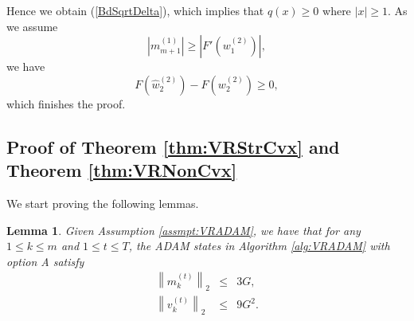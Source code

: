 \documentclass[twoside]{article}
\newtheorem{lemma}{Lemma}
\begin{document}
Hence we obtain (\ref{BdSqrtDelta}), which implies that $q(x)\geq 0$ where $|x|\geq1$. As we assume
\begin{equation*}
   \left|m^{(1)}_{m+1}\right| \geq \left|F'\left(w^{(2)}_{1}\right)\right|,
\end{equation*}
we have
\begin{equation*}
    F\left(\hat w^{(2)}_2\right) - F\left( w^{(2)}_2\right)\geq 0,
\end{equation*}
which finishes the proof.

\subsection{Proof of Theorem \ref{thm:VRStrCvx} and Theorem \ref{thm:VRNonCvx}}
We start proving the following lemmas.
\begin{lemma}
\label{lem:BdMV}
Given Assumption \ref{assmpt:VRADAM}, we have that for any $1\leq k\leq m$ and $1\leq t\leq T$, the ADAM states in Algorithm \ref{alg:VRADAM} with option A satisfy
\begin{eqnarray}
\left\|m_k^{(t)}\right\|_2 &\leq& 3G,\nonumber\\
\left\|v_k^{(t)}\right\|_2 &\leq& 9G^2.\nonumber
\end{eqnarray}
\end{lemma}
\end{document}
